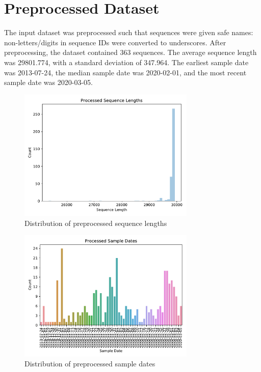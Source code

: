 \documentclass{article}
\begin{document}
\section{Preprocessed Dataset}
The input dataset was preprocessed such that sequences were given safe names: non-letters/digits in sequence IDs were converted to underscores.
After preprocessing, the dataset contained 363 sequences.
The average sequence length was 29801.774,
with a standard deviation of 347.964.
The earliest sample date was 2013-07-24,
the median sample date was 2020-02-01,
and the most recent sample date was 2020-03-05.


\begin{figure}[h]
\centering
\includegraphics[width=0.75\textwidth,keepaspectratio]{./figs/processed_sequence_lengths.pdf}
\caption{Distribution of preprocessed sequence lengths}
\end{figure}



\begin{figure}[h]
\centering
\includegraphics[width=0.75\textwidth,keepaspectratio]{./figs/processed_sample_dates.pdf}
\caption{Distribution of preprocessed sample dates}
\end{figure}
\end{document}
